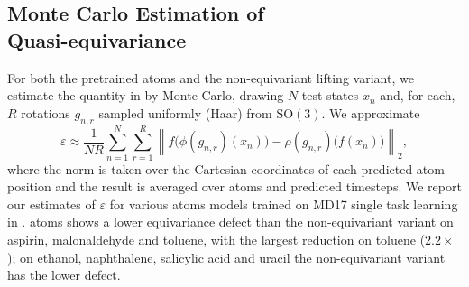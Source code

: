
\subsection[Monte Carlo Estimation of Quasi-equivariance]{Monte Carlo Estimation of\\ Quasi-equivariance}
\label{app:quasi_equivariance_mc}
{For both the pretrained \gls{atoms} and the non-equivariant lifting variant, we estimate the quantity in  by Monte Carlo, drawing \(N\) test states \(x_n\) and, for each, \(R\) rotations \(g_{n,r}\) sampled uniformly (Haar) from \(\mathrm{SO}(3)\). We approximate
\begin{equation*}
    \varepsilon \approx \frac{1}{N R} \sum_{n=1}^{N} \sum_{r=1}^{R}
    \left\|
            f\bigl(\phi(g_{n,r})(x_n)\bigr)
            - \rho(g_{n,r})\bigl(f(x_n)\bigr)
    \right\|_2 ,
\end{equation*}
where the norm is taken over the Cartesian coordinates of each predicted atom position and the result is averaged over atoms and predicted timesteps.
We report our estimates of \(\varepsilon\) for various \gls{atoms} models trained on MD17 single task learning in . \gls{atoms} shows a lower equivariance defect than the non-equivariant variant on aspirin, malonaldehyde and toluene, with the largest reduction on toluene (\(2.2\times\)); on ethanol, naphthalene, salicylic acid and uracil the non-equivariant variant has the lower defect.
}

\begin{table}[H]
\centering
\caption{Estimates of the equivariance defect \(\varepsilon\) \((\times10^{-2}\)~\AA{}) via Monte Carlo over 20 Haar-random rotations and 10 test batches with 2SD intervals.}
\label{tab:equivariance_defect}
\end{table}




